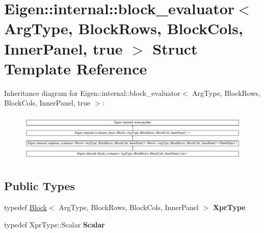 \hypertarget{struct_eigen_1_1internal_1_1block__evaluator_3_01_arg_type_00_01_block_rows_00_01_block_cols_00_01_inner_panel_00_01true_01_4}{}\section{Eigen\+::internal\+::block\+\_\+evaluator$<$ Arg\+Type, Block\+Rows, Block\+Cols, Inner\+Panel, true $>$ Struct Template Reference}
\label{struct_eigen_1_1internal_1_1block__evaluator_3_01_arg_type_00_01_block_rows_00_01_block_cols_00_01_inner_panel_00_01true_01_4}
Inheritance diagram for Eigen\+::internal\+::block\+\_\+evaluator$<$ Arg\+Type, Block\+Rows, Block\+Cols, Inner\+Panel, true $>$\+:\begin{figure}[H]
\begin{center}
\leavevmode
\includegraphics[height=2.388060cm]{struct_eigen_1_1internal_1_1block__evaluator_3_01_arg_type_00_01_block_rows_00_01_block_cols_00_01_inner_panel_00_01true_01_4}
\end{center}
\end{figure}
\subsection*{Public Types}
\begin{DoxyCompactItemize}
\item 
\mbox{\label{struct_eigen_1_1internal_1_1block__evaluator_3_01_arg_type_00_01_block_rows_00_01_block_cols_00_01_inner_panel_00_01true_01_4_aef867a45d6d161067588499d085b8a32}} 
typedef \mbox{\hyperlink{class_eigen_1_1_block}{Block}}$<$ Arg\+Type, Block\+Rows, Block\+Cols, Inner\+Panel $>$ {\bfseries Xpr\+Type}
\item 
\mbox{\label{struct_eigen_1_1internal_1_1block__evaluator_3_01_arg_type_00_01_block_rows_00_01_block_cols_00_01_inner_panel_00_01true_01_4_a09e1359e9d99e16caa8f5c7323687b0d}} 
typedef Xpr\+Type\+::\+Scalar {\bfseries Scalar}
\end{DoxyCompactItemize}

